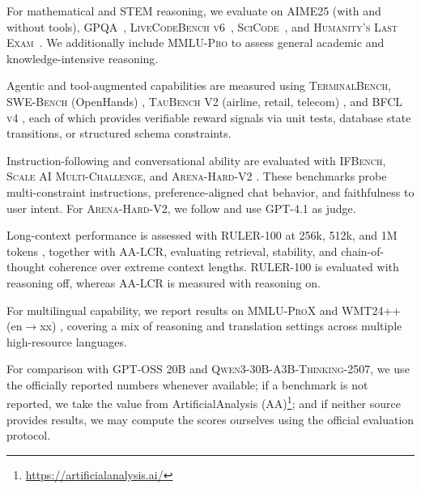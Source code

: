 For mathematical and STEM reasoning, we evaluate on \textsc{AIME25} (with and without tools), \textsc{GPQA}~\citep{rein2023gpqa}, \textsc{LiveCodeBench v6}~\citep{jain2024livecodebench},
\textsc{SciCode}~\citep{tian2024scicoderesearchcodingbenchmark},
and \textsc{Humanity’s Last Exam}~\citep{phan2025humanitysexam}.
We additionally include \textsc{MMLU-Pro} to assess general academic and
knowledge-intensive reasoning.

Agentic and tool-augmented capabilities are measured using \textsc{TerminalBench},
\textsc{SWE-Bench} (OpenHands) \citep{jimenez2023swe, wang2025openhandsopenplatformai}, 
\textsc{TauBench V2} (airline, retail, telecom) \citep{barres2025tau}, 
and \textsc{BFCL v4} \citep{patil2025bfcl}, each of which provides verifiable reward signals via
unit tests, database state transitions, or structured schema constraints.

Instruction-following and conversational ability are evaluated with \textsc{IFBench},
\textsc{Scale AI Multi-Challenge}, and \textsc{Arena-Hard-V2} \citep{li2024crowdsourced}. 
These benchmarks probe multi-constraint instructions, preference-aligned chat behavior, and faithfulness to user intent. For \textsc{Arena-Hard-V2}, we follow \citet{yang2025qwen3technicalreport} and use GPT-4.1 as judge.

Long-context performance is assessed with \textsc{RULER-100} at 256k, 512k, and 1M tokens \citep{hsieh2024ruler},
together with \textsc{AA-LCR}, evaluating retrieval, stability, and chain-of-thought
coherence over extreme context lengths. RULER-100 is evaluated with reasoning off, whereas AA-LCR is measured with reasoning on.

For multilingual capability, we report results on \textsc{MMLU-ProX} \citep{xuan2025mmlu} and
\textsc{WMT24++} (en$\rightarrow$xx) \citep{deutsch2025wmt24++}, covering a mix of reasoning and translation
settings across multiple high-resource languages.

For comparison with \textsc{GPT-OSS 20B} and \textsc{Qwen3-30B-A3B-Thinking-2507}, we use the officially reported numbers whenever available; if a benchmark is not reported, we take the value from ArtificialAnalysis (AA)\footnote{\url{https://artificialanalysis.ai/}}; and if neither source provides results, we may compute the scores ourselves using the official evaluation protocol.


